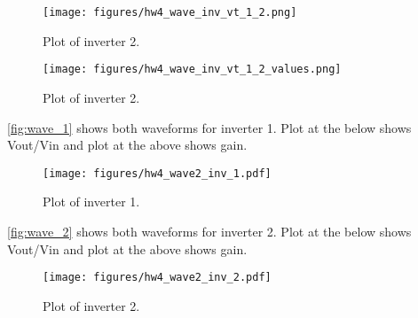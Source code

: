 \documentclass[a4paper,10pt]{article}
\begin{document}
\begin{figure}[!h]
 \centering
 \texttt{[image: figures/hw4\_wave\_inv\_vt\_1\_2.png]}
 \caption{Plot of inverter 2.}
 \label{fig:wave_vth}
\end{figure}

\begin{figure}[!h]
 \centering
 \texttt{[image: figures/hw4\_wave\_inv\_vt\_1\_2\_values.png]}
 \caption{Plot of inverter 2.}
 \label{fig:wave_vth_cursor}
\end{figure}

\newpage


\autoref{fig:wave_1} shows both waveforms for inverter 1. Plot at the below shows Vout/Vin and plot at the above shows gain.

\begin{figure}[!h]
 \centering
 \texttt{[image: figures/hw4\_wave2\_inv\_1.pdf]}
 \caption{Plot of inverter 1.}
 \label{fig:wave_1}
\end{figure}


\autoref{fig:wave_2} shows both waveforms for inverter 2. Plot at the below shows Vout/Vin and plot at the above shows gain.



\begin{figure}[!h]
 \centering
 \texttt{[image: figures/hw4\_wave2\_inv\_2.pdf]}
 \caption{Plot of inverter 2.}
 \label{fig:wave_2}
\end{figure}

\newpage

%
%
\end{document}
